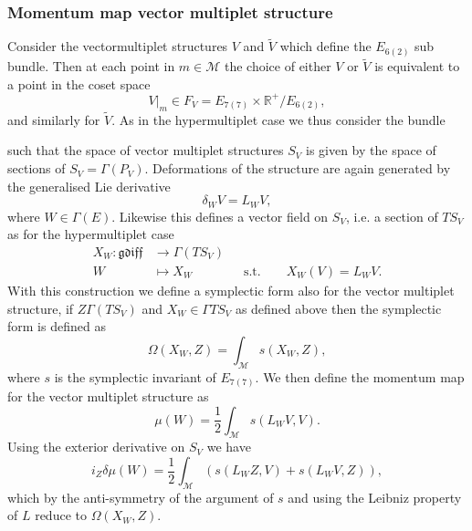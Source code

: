 \subsubsection{Momentum map vector multiplet structure}
Consider the vectormultiplet structures $V$ and $\tilde{V}$ which define the $E_{6(2)}$ sub bundle. Then at each point in $m\in\mathcal{M}$ the choice of either $V$ or $\tilde{V}$ is equivalent to a point in the coset space 
\begin{equation}
    V|_m \in F_V = E_{7(7)}\times\mathbb{R}^+/E_{6(2)},
\end{equation}
and similarly for $\tilde{V}$. As in the hypermultiplet case we thus consider the bundle 
\begin{center}
\end{center}
such that the space of vector multiplet structures $S_V$ is given by the space of sections of $S_V=\Gamma(P_V)$. Deformations of the structure are again generated by the generalised Lie derivative 
\begin{equation}
    \delta_W V = L_WV,
\end{equation}
where $W\in\Gamma(E)$. Likewise this defines a vector field on $S_V$, i.e. a section of $TS_V$ as for the hypermultiplet case 
\begin{align}
    X_W: \mathfrak{gdiff}&\to \Gamma(TS_V)\\
        W&\mapsto X_W \qquad\qquad  \text{s.t.}\qquad X_W(V)=L_WV.
\end{align}
With this construction we define a symplectic form also for the vector multiplet structure, if $Z\Gamma(TS_V)$ and $X_W\in\Gamma{TS_V}$ as defined above then the symplectic form is defined as  
\begin{equation}
    \Omega(X_W,Z) =\int_\mathcal{M}s(X_W,Z),
\end{equation}
where $s$ is the symplectic invariant of $E_{7(7)}$. We then define the momentum map for the vector multiplet structure as 
\begin{equation}
    \mu(W) = \frac{1}{2}\int_\mathcal{M}s(L_WV,V). 
\end{equation}
Using the exterior derivative on $S_V$ we have 
\begin{equation}
    i_Z\delta\mu(W) = \frac{1}{2}\int_\mathcal{M}\left(s(L_WZ,V)+s(L_WV,Z)\right),
\end{equation}
which by the anti-symmetry of the argument of $s$ and using the Leibniz property of $L$ reduce to $\Omega(X_W,Z)$. 


